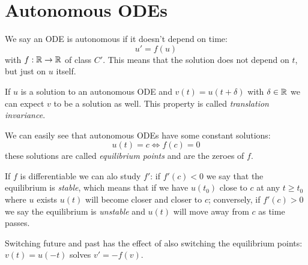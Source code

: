 \documentclass[12pt]{extarticle}
\begin{document}
\section{Autonomous ODEs}

We say an ODE is autonomous if it doesn't depend on time:
\begin{equation}
    u' = f(u)
\end{equation}
with $f: \mathbb{R} \to \mathbb{R}$ of class $C'$.
This means that the solution does not depend on $t$, but just on $u$ itself.

If $u$ is a solution to an autonomous ODE and $v(t) = u(t + \delta)$ with $\delta \in \mathbb{R}$ we can expect $v$ to be a solution as well.
This property is called \emph{translation invariance}.

We can easily see that autonomous ODEs have some constant solutions:
\begin{equation}
    u(t) = c \iff f(c) = 0
\end{equation}
these solutions are called \emph{equilibrium points} and are the zeroes of $f$.

If $f$ is differentiable we can alo study $f'$: if $f'(c) < 0$ we say that the equilibrium is \emph{stable}, which means that if we have $u(t_0)$ close to $c$ at any $t \geq t_0$ where $u$ exists $u(t)$ will become closer and closer to $c$; conversely, if $f'(c) > 0$ we say the equilibrium is \emph{unstable} and $u(t)$ will move away from $c$ as time passes.

Switching future and past has the effect of also switching the equilibrium points: $v(t) = u(-t)$ solves $v' = -f(v)$.
\end{document}
